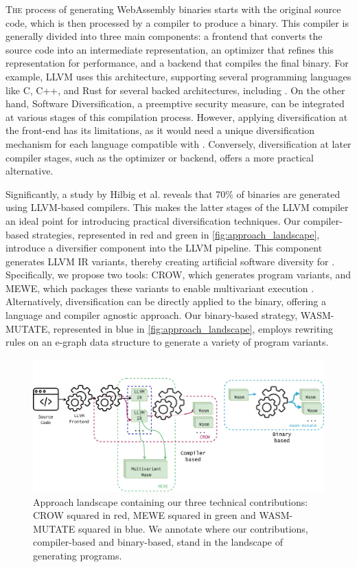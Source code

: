 
\lettrine[lines=3]{T}{he} process of generating WebAssembly binaries starts with the original source code, which is then processed by a compiler to produce a \Wasm binary. 
This compiler is generally divided into three main components: a frontend that converts the source code into an intermediate representation, an optimizer that refines this representation for performance, and a backend that compiles the final \Wasm binary. 
For example, LLVM uses this architecture, supporting several programming languages like C, C++, and Rust for several backed architectures, including  \Wasm.
On the other hand, Software Diversification, a preemptive security measure, can be integrated at various stages of this compilation process. 
However, applying diversification at the front-end has its limitations, as it would need a unique diversification mechanism for each language compatible with \Wasm. 
Conversely, diversification at later compiler stages, such as the optimizer or backend, offers a more practical alternative.

Significantly, a study by Hilbig et al. reveals that 70\% of \Wasm binaries are generated using LLVM-based compilers. 
This makes the latter stages of the LLVM compiler an ideal point for introducing practical \wasm diversification techniques. 
Our compiler-based strategies, represented in red and green in \autoref{fig:approach_landscape}, introduce a diversifier component into the LLVM pipeline. 
This component generates LLVM IR variants, thereby creating artificial software diversity for \Wasm. 
Specifically, we propose two tools: CROW, which generates \Wasm program variants, and MEWE, which packages these variants to enable multivariant execution \cite{cox06}.
Alternatively, diversification can be directly applied to the \Wasm binary, offering a language and compiler agnostic approach. 
Our binary-based strategy, WASM-MUTATE, represented in blue in \autoref{fig:approach_landscape}, employs rewriting rules on an e-graph data structure to generate a variety of \Wasm program variants.



\begin{figure}[h]
	\centering
	\includegraphics[width=1.0\textwidth]{figures/landscape.pdf}
	\caption{Approach landscape containing our three technical contributions: CROW squared in red, MEWE squared in green and WASM-MUTATE squared in blue. We annotate where our contributions, compiler-based and binary-based, stand in the landscape of generating \Wasm programs.}
	\label{fig:approach_landscape}
\end{figure}


